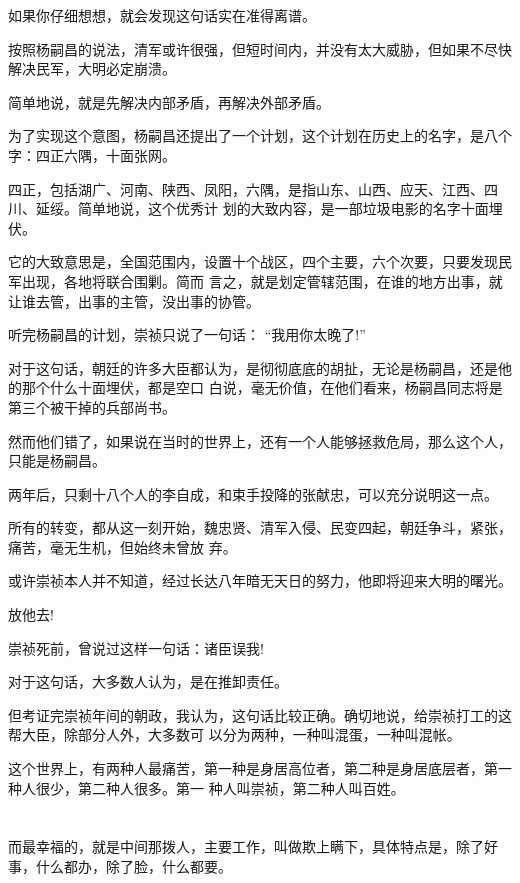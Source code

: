 \documentclass[11pt,a4paper,onecolumn]{article}
\begin{document}
如果你仔细想想，就会发现这句话实在准得离谱。

按照杨嗣昌的说法，清军或许很强，但短时间内，并没有太大威胁，但如果不尽快解决民军，大明必定崩溃。

简单地说，就是先解决内部矛盾，再解决外部矛盾。

为了实现这个意图，杨嗣昌还提出了一个计划，这个计划在历史上的名字，是八个字：四正六隅，十面张网。

四正，包括湖广、河南、陕西、凤阳，六隅，是指山东、山西、应天、江西、四川、延绥。简单地说，这个优秀计
划的大致内容，是一部垃圾电影的名字\myrule 十面埋伏。

它的大致意思是，全国范围内，设置十个战区，四个主要，六个次要，只要发现民军出现，各地将联合围剿。简而
言之，就是划定管辖范围，在谁的地方出事，就让谁去管，出事的主管，没出事的协管。

听完杨嗣昌的计划，崇祯只说了一句话： ``我用你太晚了!''

对于这句话，朝廷的许多大臣都认为，是彻彻底底的胡扯，无论是杨嗣昌，还是他的那个什么十面埋伏，都是空口
白说，毫无价值，在他们看来，杨嗣昌同志将是第三个被干掉的兵部尚书。

然而他们错了，如果说在当时的世界上，还有一个人能够拯救危局，那么这个人，只能是杨嗣昌。

两年后，只剩十八个人的李自成，和束手投降的张献忠，可以充分说明这一点。

所有的转变，都从这一刻开始，魏忠贤、清军入侵、民变四起，朝廷争斗，紧张，痛苦，毫无生机，但始终未曾放
弃。

或许崇祯本人并不知道，经过长达八年暗无天日的努力，他即将迎来大明的曙光。

放他去!

崇祯死前，曾说过这样一句话：诸臣误我!

对于这句话，大多数人认为，是在推卸责任。

但考证完崇祯年间的朝政，我认为，这句话比较正确。确切地说，给崇祯打工的这帮大臣，除部分人外，大多数可
以分为两种，一种叫混蛋，一种叫混帐。

这个世界上，有两种人最痛苦，第一种是身居高位者，第二种是身居底层者，第一种人很少，第二种人很多。第一
种人叫崇祯，第二种人叫百姓。

\section[\thesection]{}

而最幸福的，就是中间那拨人，主要工作，叫做欺上瞒下，具体特点是，除了好事，什么都办，除了脸，什么都要。
\end{document}
